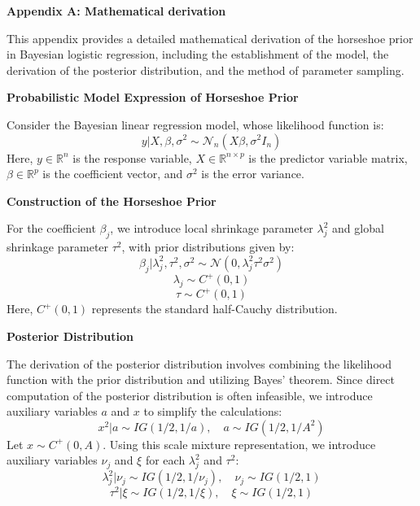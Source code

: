 \documentclass{mcmthesis}
\begin{document}
\newpage
\begin{appendices}

\textbf{Appendix A: Mathematical derivation}%

This appendix provides a detailed mathematical derivation of the horseshoe prior in Bayesian logistic regression, including the establishment of the model, the derivation of the posterior distribution, and the method of parameter sampling.

\centerline{\textbf{Probabilistic Model Expression of Horseshoe Prior}}

Consider the Bayesian linear regression model, whose likelihood function is:
\begin{equation}
  y|X, \beta, \sigma^2 \sim \mathcal{N}_n(X\beta, \sigma^2 I_n)
  \tag{1}
\end{equation}
Here, $y \in \mathbb{R}^n$ is the response variable, $X \in \mathbb{R}^{n \times p}$ is the predictor variable matrix, $\beta \in \mathbb{R}^p$ is the coefficient vector, and $\sigma^2$ is the error variance.

\noindent\textbf{Construction of the Horseshoe Prior}

For the coefficient $\beta_j$, we introduce local shrinkage parameter $\lambda_j^2$ and global shrinkage parameter $\tau^2$, with prior distributions given by:
\begin{equation}
  \beta_j | \lambda^2_j, \tau^2, \sigma^2 \sim \mathcal{N}(0, \lambda_j^2 \tau^2 \sigma^2) \tag{2}
\end{equation}
\begin{equation}
  \lambda_j \sim C^+(0, 1) \tag{3}
\end{equation}
\begin{equation}
  \tau \sim C^+(0, 1)  \tag{4}
\end{equation}
Here, $C^+(0, 1)$ represents the standard half-Cauchy distribution.

\noindent\textbf{Posterior Distribution}

The derivation of the posterior distribution involves combining the likelihood function with the prior distribution and utilizing Bayes' theorem. Since direct computation of the posterior distribution is often infeasible, we introduce auxiliary variables $a$ and $x$ to simplify the calculations:
\begin{equation}
  x^2|a \sim IG(1/2, 1/a), \quad a \sim IG(1/2, 1/A^2) \tag{5}
\end{equation}
Let $x \sim C^+(0, A)$. Using this scale mixture representation, we introduce auxiliary variables $\nu_j$ and $\xi$ for each $\lambda_j^2$ and $\tau^2$:
\begin{equation}
  \lambda_j^2|\nu_j \sim IG(1/2, 1/\nu_j), \quad \nu_j \sim IG(1/2, 1) \tag{6}
\end{equation}
\begin{equation}
  \tau^2|\xi \sim IG(1/2, 1/\xi), \quad \xi \sim IG(1/2, 1) \tag{7}
\end{equation}


\end{appendices}
\end{document}
